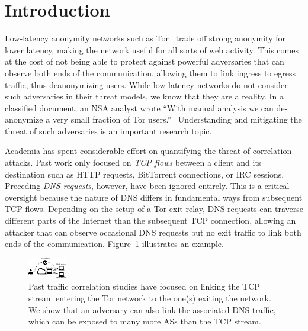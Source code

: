 \section{Introduction}
\label{sec:introduction}

Low-latency anonymity networks such as Tor~\cite{Dingledine2004a} trade off
strong anonymity for lower latency, making the network useful for all sorts of
web activity.  This comes at the cost of not being able to protect against
powerful adversaries that can observe both ends of the communication, allowing
them to link ingress to egress traffic, thus deanonymizing users.  While
low-latency networks do not consider such adversaries in their threat models,
we know that they are a reality.  In a classified document, an NSA analyst
wrote ``With manual analysis we can de-anonymize a very small fraction of Tor
users.''~\cite{torstinks} Understanding and mitigating the threat of such
adversaries is an important research topic.

Academia has spent considerable effort on quantifying the threat of correlation
attacks.  Past work only focused on \emph{TCP flows} between a client and its
destination such as HTTP requests, BitTorrent connections, or IRC sessions.
Preceding \emph{DNS requests}, however, have been ignored entirely.  This is a
critical oversight because the nature of DNS differs in fundamental ways from
subsequent TCP flows.  Depending on the setup of a Tor exit relay, DNS requests
can traverse different parts of the Internet than the subsequent TCP
connection, allowing an attacker that can observe occasional DNS requests but
no exit traffic to link both ends of the communication.
Figure~\ref{fig:overview} illustrates an example.

\begin{figure}[t]
	\centering
	\includegraphics[width=0.8\linewidth]{figures/attack-concept.pdf}
	\caption{Past traffic correlation studies have focused on linking the TCP
		stream entering the Tor network to the one(s) exiting the network.  We
		show that an adversary can also link the associated DNS traffic, which
		can be exposed to many more ASs than the TCP stream.}
	\label{fig:overview}
\end{figure}

